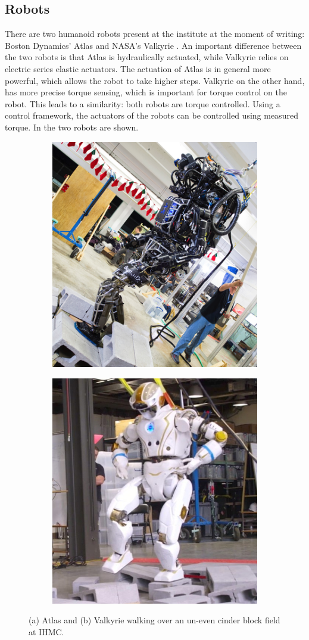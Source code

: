 \subsection{Robots}
There are two humanoid robots present at the institute at the moment of writing: Boston Dynamics' Atlas and NASA's Valkyrie \cite{radford2015valkyrie}. An important difference between the two robots is that Atlas is hydraulically actuated, while Valkyrie relies on electric series elastic actuators. The actuation of Atlas is in general more powerful, which allows the robot to take higher steps. Valkyrie on the other hand, has more precise torque sensing, which is important for torque control on the robot. This leads to a similarity: both robots are torque controlled. Using a control framework, the actuators of the robots can be controlled using measured torque. In  the two robots are shown.
\begin{figure}[h]
\centering
  \begin{subfigure}{0.49\textwidth}
  \centering
  \includegraphics[width=.6\linewidth]{STYLESTUFF/AtlasOld1.png}
   \caption{}
    \label{fig:atlas}
  \end{subfigure}
  \begin{subfigure}{0.49\textwidth}
    \centering
  \includegraphics[width=.6\linewidth]{STYLESTUFF/Valkyrie1.png}
  \caption{}
   \label{fig:valkyrie}
  \end{subfigure}
  \caption{(a) Atlas \cite{oldatlas} and (b) Valkyrie \cite{valkyrie} walking over an un-even cinder block field at \ac{IHMC}. }
  \label{fig:robots}
\end{figure}

